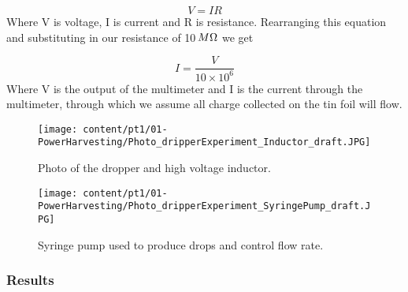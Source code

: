 \begin{equation}
V=IR
\end{equation}
Where V is voltage, I is current and R is resistance. Rearranging
this equation and substituting in our resistance of 10$\thinspace M\Omega$
we get

\begin{equation}
I=\frac{V}{10\times10^{6}}
\end{equation}
Where V is the output of the multimeter and I is the current through
the multimeter, through which we assume all charge collected on the
tin foil will flow.

\begin{figure}
\begin{centering}
\texttt{[image: content/pt1/01-PowerHarvesting/Photo\_dripperExperiment\_Inductor\_draft.JPG]}
\par\end{centering}

\begin{raggedright}
\protect\caption{Photo of the dropper and high voltage inductor.}

\par\end{raggedright}

\raggedright{}\label{Photo_dripperExperiment_Inductor}
\end{figure}


\begin{figure}
\begin{centering}
\texttt{[image: content/pt1/01-PowerHarvesting/Photo\_dripperExperiment\_SyringePump\_draft.JPG]}
\par\end{centering}

\begin{centering}
\protect\caption{\label{Photo_dripperExperiment_SyringePump}Syringe pump used to produce
drops and control flow rate.}

\par\end{centering}

\end{figure}



\subsubsection{Results}

